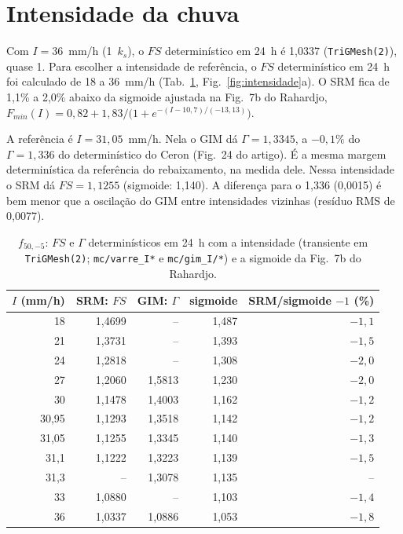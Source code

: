 \documentclass[11pt,a4paper]{article}
\begin{document}
\section{Intensidade da chuva}\label{sec:intensidade}
Com $I = 36$~mm/h (1~$k_s$), o $FS$ determinístico em 24~h é 1,0337 (\texttt{TriGMesh(2)}), quase 1. Para escolher a
intensidade de referência, o $FS$ determinístico em 24~h foi calculado de 18 a 36~mm/h (Tab.~\ref{tab:intensidade},
Fig.~\ref{fig:intensidade}a). O SRM fica de 1,1\% a 2,0\% abaixo da sigmoide ajustada na Fig.~7b do Rahardjo,
$F_{min}(I) = 0{,}82 + 1{,}83/\bigl(1 + e^{-(I - 10{,}7)/(-13{,}13)}\bigr)$.

A referência é $I = 31{,}05$~mm/h. Nela o GIM dá $\Gamma = 1{,}3345$, a $-0{,}1\%$ do $\Gamma = 1{,}336$ do determinístico
do Ceron (Fig.~24 do artigo). É a mesma margem determinística da referência do rebaixamento, na medida dele. Nessa
intensidade o SRM dá $FS = 1{,}1255$ (sigmoide: 1,140). A diferença para o 1,336 (0,0015) é bem menor que a oscilação
do GIM entre intensidades vizinhas (resíduo RMS de 0,0077).

\begin{table}[htbp]\centering\footnotesize
\caption{$f_{50,-5}$: $FS$ e $\Gamma$ determinísticos em 24~h com a intensidade (transiente em \texttt{TriGMesh(2)};
\texttt{mc/varre\_I*} e \texttt{mc/gim\_I/*}) e a sigmoide da Fig.~7b do Rahardjo.}\label{tab:intensidade}
\begin{tabular}{rrrrr}\toprule
$I$ (mm/h) & SRM: $FS$ & GIM: $\Gamma$ & sigmoide & SRM/sigmoide $- 1$ (\%) \\\midrule
18 & 1,4699 & -- & 1,487 & $-1{,}1$ \\
21 & 1,3731 & -- & 1,393 & $-1{,}5$ \\
24 & 1,2818 & -- & 1,308 & $-2{,}0$ \\
27 & 1,2060 & 1,5813 & 1,230 & $-2{,}0$ \\
30 & 1,1478 & 1,4003 & 1,162 & $-1{,}2$ \\
30,95 & 1,1293 & 1,3518 & 1,142 & $-1{,}2$ \\
31,05 & 1,1255 & 1,3345 & 1,140 & $-1{,}3$ \\
31,1 & 1,1222 & 1,3223 & 1,139 & $-1{,}5$ \\
31,3 & -- & 1,3078 & 1,135 & -- \\
33 & 1,0880 & -- & 1,103 & $-1{,}4$ \\
36 & 1,0337 & 1,0886 & 1,053 & $-1{,}8$ \\
\bottomrule\end{tabular}\end{table}
\end{document}
